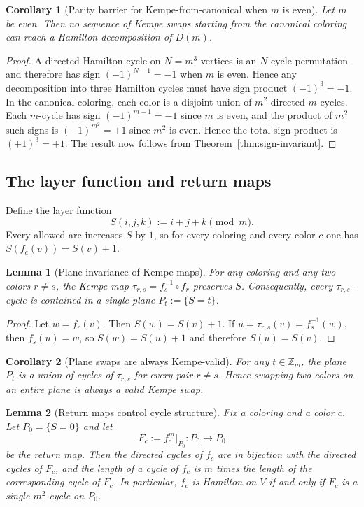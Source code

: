 \documentclass[11pt]{article}
\newtheorem{lemma}{Lemma}
\newtheorem{corollary}{Corollary}
\begin{document}
\begin{corollary}[Parity barrier for Kempe-from-canonical when $m$ is even]\label{cor:parity-barrier}
Let $m$ be even. Then no sequence of Kempe swaps starting from the canonical coloring can reach a Hamilton decomposition of $D(m)$.
\end{corollary}

\begin{proof}
A directed Hamilton cycle on $N=m^3$ vertices is an $N$-cycle permutation and therefore has sign $(-1)^{N-1}=-1$ when $m$ is even.
Hence any decomposition into three Hamilton cycles must have sign product $(-1)^3=-1$.
In the canonical coloring, each color is a disjoint union of $m^2$ directed $m$-cycles.
Each $m$-cycle has sign $(-1)^{m-1}=-1$ since $m$ is even, and the product of $m^2$ such signs is $(-1)^{m^2}=+1$ since $m^2$ is even.
Hence the total sign product is $(+1)^3=+1$.
The result now follows from Theorem~\ref{thm:sign-invariant}.
\end{proof}

\subsection{The layer function and return maps}
Define the layer function
\[
S(i,j,k):=i+j+k\pmod m.
\]
Every allowed arc increases $S$ by $1$, so for every coloring and every color $c$ one has $S(f_c(v))=S(v)+1$.

\begin{lemma}[Plane invariance of Kempe maps]\label{lem:plane-invariant}
For any coloring and any two colors $r\ne s$, the Kempe map $\tau_{r,s}=f_s^{-1}\circ f_r$ preserves $S$.
Consequently, every $\tau_{r,s}$-cycle is contained in a single plane $P_t:=\{S=t\}$.
\end{lemma}

\begin{proof}
Let $w=f_r(v)$. Then $S(w)=S(v)+1$.
If $u=\tau_{r,s}(v)=f_s^{-1}(w)$, then $f_s(u)=w$, so $S(w)=S(u)+1$ and therefore $S(u)=S(v)$.
\end{proof}

\begin{corollary}[Plane swaps are always Kempe-valid]\label{cor:plane-swaps}
For any $t\in\mathbb Z_m$, the plane $P_t$ is a union of cycles of $\tau_{r,s}$ for every pair $r\ne s$.
Hence swapping two colors on an entire plane is always a valid Kempe swap.
\end{corollary}

\begin{lemma}[Return maps control cycle structure]\label{lem:return}
Fix a coloring and a color $c$.
Let $P_0=\{S=0\}$ and let
\[
F_c:=f_c^m\big|_{P_0}:P_0\to P_0
\]
be the return map.
Then the directed cycles of $f_c$ are in bijection with the directed cycles of $F_c$, and the length of a cycle of $f_c$ is $m$ times the length of the corresponding cycle of $F_c$.
In particular, $f_c$ is Hamilton on $V$ if and only if $F_c$ is a single $m^2$-cycle on $P_0$.
\end{lemma}
\end{document}
